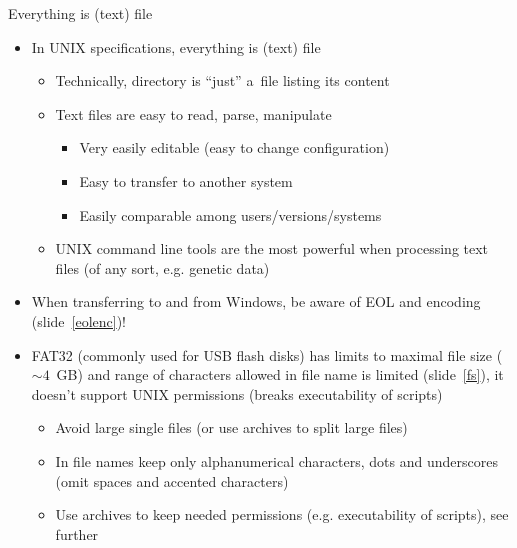 \documentclass[compress, ucs, xelatex, 11pt, xcolor=svgnames, aspectratio=169,
	hyperref={
		bookmarks=true,
		unicode=true,
		colorlinks=true,
		pdftitle={Linux, command line and MetaCentrum},
		plainpages=false,
		pdfauthor={Vojtech Zeisek},
		pdfsubject={Course about use of Linux command line, writing shell scripts and using MetaCentrum of CESNET},
		pdfcreator={XeLaTeX},
		pdfkeywords={Linux, GNU, BASH, shell, command line, MetaCentrum},
		linkcolor=DarkRed, %
		anchorcolor=DarkBlue, %
		citecolor=Indigo, %
		filecolor=NavyBlue, %
		menucolor=DarkMagenta, %
		urlcolor=DarkBlue, %
		pdftex},
	url={hyphens, lowtilde} %
	]{beamer}
\begin{document}
\begin{frame}{Everything is (text) file}
	\begin{itemize}
		\item In UNIX specifications, everything is (text) file
		\begin{itemize}
			\item Technically, directory is \enquote{just} a~file listing its content
			\item Text files are easy to read, parse, manipulate
			\begin{itemize}
				\item Very easily editable (easy to change configuration)
				\item Easy to transfer to another system
				\item Easily comparable among users/versions/systems
			\end{itemize}
			\item UNIX command line tools are the most powerful when processing text files (of any sort, e.g. genetic data)
		\end{itemize}
		\item When transferring to and from Windows, be aware of EOL and encoding (slide~\ref{eolenc})!
		\item FAT32 (commonly used for USB flash disks) has limits to maximal file size ($\sim4$~GB) and range of characters allowed in file name is limited (slide~\ref{fs}), it doesn't support UNIX permissions (breaks executability of scripts)
		\begin{itemize}
			\item Avoid large single files (or use archives to split large files)
			\item In file names keep only alphanumerical characters, dots and underscores (omit spaces and accented characters)
			\item Use archives to keep needed permissions (e.g. executability of scripts), see further
		\end{itemize}
		\end{itemize}
\end{frame}
\end{document}
